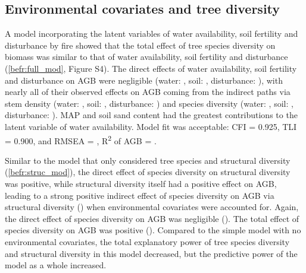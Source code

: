 \begin{refsection}
\subsection{Environmental covariates and tree diversity}
\label{befr:ssec:env}

A model incorporating the latent variables of water availability, soil fertility and disturbance by fire showed that the total effect of tree species diversity on biomass was similar to that of water availability, soil fertility and disturbance (\autoref{befr:full_mod}, Figure S4). The direct effects of water availability, soil fertility and disturbance on AGB were negligible (water: \fmbetamb{}, soil: \fmbetasb{}, disturbance: \fmbetafb{}), with nearly all of their observed effects on AGB coming from the indirect paths via stem density (water: \fmbetamib{}, soil: \fmbetasib{}, disturbance: \fmbetafib{}) and species diversity (water: \fmbetamd{}, soil: \fmbetasd{}, disturbance: \fmbetafd{}). MAP and soil sand content had the greatest contributions to the latent variable of water availability. Model fit was acceptable: CFI = 0.925, TLI = 0.900, and RMSEA = \fmrmsea{}, R\textsuperscript{2} of AGB = \fmrsq{}. 

Similar to the model that only considered tree species and structural diversity (\autoref{befr:struc_mod}), the direct effect of species diversity on structural diversity was positive, while structural diversity itself had a positive effect on AGB, leading to a strong positive indirect effect of species diversity on AGB via structural diversity (\fmbetadhb{}) when environmental covariates were accounted for. Again, the direct effect of species diversity on AGB was negligible (\fmbetadb{}). The total effect of species diversity on AGB was positive (\fmbetatotaldb{}). Compared to the simple model with no environmental covariates, the total explanatory power of tree species diversity and structural diversity in this model decreased, but the predictive power of the model as a whole increased.


\end{refsection}
